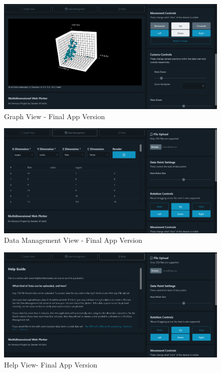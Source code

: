 \begin{figure}[h]
    \centering
    \includegraphics[width=1\columnwidth]{author-files/figures/Graph-Fin.PNG}
    \caption{Graph View - Final App Version}
    \label{fig:graphfin}
\end{figure}
\begin{figure}[h]
    \centering
    \includegraphics[width=1\columnwidth]{author-files/figures/data-fin.PNG}
    \caption{Data Management View - Final App Version}
    \label{fig:datafin}
\end{figure}
\begin{figure}[h]
    \centering
    \includegraphics[width=1\columnwidth]{author-files/figures/help-fin.PNG}
    \caption{Help View- Final App Version}
    \label{fig:helpfin}
\end{figure}

